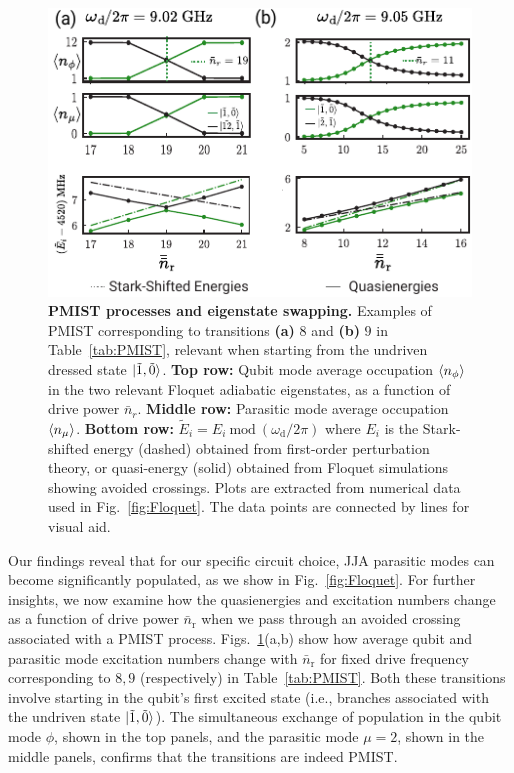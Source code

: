 \documentclass[%
reprint,
superscriptaddress,
 amsmath,amssymb,
 aps,
 prx,
longbibliography,
floatfix,
]{revtex4-2}
\begin{document}
 \begin{figure}[t]
    \centering
    \includegraphics[width=\linewidth]{Figures/Floquet_011.pdf}
    \caption{{\bf PMIST processes and eigenstate swapping.} Examples of PMIST corresponding to transitions \textbf{(a)} $8$ and \textbf{(b)} $9$ in Table~\ref{tab:PMIST}, relevant when starting from the undriven dressed state 
    $\ket{\tilde{1},\tilde{0}}$.
    \textbf{Top row:} Qubit mode average occupation $\braket{n_\phi}$
    in the two relevant Floquet adiabatic eigenstates, as a function of drive power $\bar{n}_r$.  \textbf{Middle row:} Parasitic mode average occupation $\braket{n_\mu}$. \textbf{Bottom row:} $\tilde{E}_i=E_i \ \textrm{mod} \ (\omega_\textrm{d}/2\pi)$ where $E_i$ is the Stark-shifted energy (dashed) obtained from first-order perturbation theory, or quasi-energy (solid) obtained from Floquet simulations showing avoided crossings. Plots are extracted from numerical data used in Fig.~\ref{fig:Floquet}. The data points are connected by lines for visual aid.}
    \label{fig:011}
\end{figure}

Our findings reveal that for our specific circuit choice, JJA parasitic modes can become significantly populated, as we show in Fig.~\ref{fig:Floquet}. For further insights, we now examine how the quasienergies and excitation numbers change as a function of drive power $\bar{n}_\textrm{r}$ when we pass through an avoided crossing associated with a PMIST process. Figs.~\ref{fig:011}(a,b) show how average qubit and parasitic mode excitation numbers change with $\bar n_\textrm{r}$ for fixed drive frequency corresponding to $8,9$ (respectively) in Table~\ref{tab:PMIST}. Both these transitions involve starting in the qubit's first excited state (i.e., branches associated with the undriven state $\ket{\tilde{1},\tilde{0}}$). The simultaneous exchange of population in the qubit mode $\phi$, shown in the top panels, and the parasitic mode $\mu=2$, shown in the middle panels, confirms that the transitions are indeed PMIST.
\end{document}
